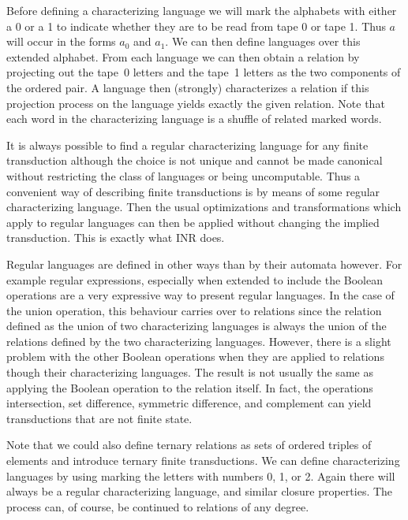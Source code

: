 Before defining a characterizing language we will mark the alphabets with
either a 0 or a 1 to indicate whether they are to be read from tape 0 or
tape 1.
Thus $a$ will occur in the forms $a_0$ and $a_1$.
We can then define languages over this extended alphabet.
From each language we can then obtain a relation by projecting out the
tape~0 letters and the tape~1 letters as the two components of the ordered
pair.
A language then (strongly) characterizes a relation if this projection
process on the language yields exactly the given relation.
Note that each word in the characterizing language is a shuffle of related
marked words.

It is always possible to find a regular characterizing language for any
finite transduction although the choice is not unique and cannot be made
canonical without restricting the class of languages or being
uncomputable.
Thus a convenient way of describing finite transductions is by means of
some regular characterizing language.
Then the usual optimizations and transformations which apply to regular
languages can then be applied without changing the implied transduction.
This is exactly what INR does.

Regular languages are defined in other ways than by their automata however.
For example regular expressions, especially when extended to include the
Boolean operations are a very expressive way to present regular languages.
In the case of the union operation, this behaviour carries over to
relations since the relation defined as the union of two characterizing
languages is always the union of the relations defined by the two
characterizing languages.
However, there is a slight problem with the other Boolean operations when they
are applied to relations though their characterizing languages.
The result is not usually the same as applying the Boolean operation to the
relation itself.
In fact, the operations intersection, set difference, symmetric difference,
and complement can yield transductions that are not finite state.

Note that we could also define ternary relations as sets of ordered triples
of elements and introduce ternary finite transductions.
We can define characterizing languages by using marking the letters with
numbers 0, 1, or 2.
Again there will always be a regular characterizing language, and similar
closure properties.
The process can, of course, be continued to relations of any degree.

